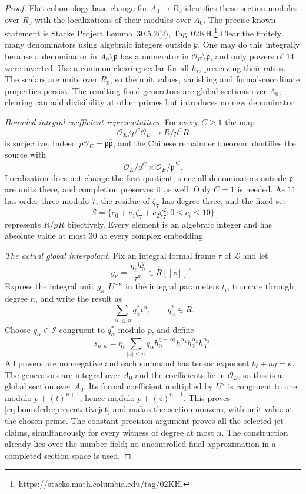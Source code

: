 \documentclass[11pt,a4paper]{article}
\theoremstyle{definition}\newtheorem{remark}[theorem]{Remark}
\begin{document}
\begin{proof}
Flat cohomology base change for $A_0\to R_0$ identifies these section modules over $R_0$ with the localizations of their modules over $A_0$.
The precise known statement is Stacks Project Lemma~30.5.2(2), Tag~02KH.\footnote{\url{https://stacks.math.columbia.edu/tag/02KH}.}
Clear the finitely many denominators using algebraic integers outside $\mathfrak p$.
One may do this integrally because a denominator in $A_0\setminus\mathfrak p$ has a numerator in $\mathcal O_E\setminus\mathfrak p$, and only powers of $14$ were inverted.
Use a common clearing scalar for all $h_i$, preserving their ratios.
The scalars are units over $R_0$, so the unit values, vanishing and formal-coordinate properties persist.
The resulting fixed generators are global sections over $A_0$; clearing can add divisibility at other primes but introduces no new denominator.

\emph{Bounded integral coefficient representatives.}
For every $C\ge1$ the map
\[
 \mathcal O_E/p^C\mathcal O_E\longrightarrow R/p^CR
\]
is surjective.
Indeed $p\mathcal O_E=\mathfrak p\overline{\mathfrak p}$, and the Chinese remainder theorem identifies the source with
\[
 \mathcal O_E/\mathfrak p^C\times
 \mathcal O_E/\overline{\mathfrak p}^{\,C}.
\]
Localization does not change the first quotient, since all denominators outside $\mathfrak p$ are units there, and completion preserves it as well.
Only $C=1$ is needed.
As $11$ has order three modulo $7$, the residue of $\zeta_7$ has degree three, and the fixed set
\[
 \mathcal S=\{c_0+c_1\zeta_7+c_2\zeta_7^2:
                 0\le c_i\le10\}
\]
represents $R/pR$ bijectively.
Every element is an algebraic integer and has absolute value at most $30$ at every complex embedding.

\emph{The actual global interpolant.}
Fix an integral formal frame $\tau$ of $\mathcal L$ and let
\[
 g_\kappa=\frac{\eta_\ell h_0^q}{\tau^\kappa}
 \in R[[z]]^\times.
\]
Express the integral unit $g_\kappa^{-1}U^{-\kappa}$ in the integral parameters $t_i$, truncate through degree $n$, and write the result as
\[
 \sum_{|\alpha|\le n}q^*_\alpha t^\alpha,
 \qquad q^*_\alpha\in R.
\]
Choose $q_\alpha\in\mathcal S$ congruent to $q^*_\alpha$ modulo $p$, and define
\begin{equation}\label{eq:boundedglobalinterpolant}
 s_{n,\kappa}
 =\eta_\ell\sum_{|\alpha|\le n}q_\alpha
      h_0^{q-|\alpha|}h_1^{\alpha_1}
      h_2^{\alpha_2}h_3^{\alpha_3}.
\end{equation}
All powers are nonnegative and each summand has tensor exponent $b_\ell+aq=\kappa$.
The generators are integral over $A_0$ and the coefficients lie in $\mathcal O_E$, so this is a global section over $A_0$.
Its formal coefficient multiplied by $U^\kappa$ is congruent to one modulo $p+(t)^{n+1}$, hence modulo $p+(z)^{n+1}$.
This proves \eqref{eq:boundedrepresentativejet} and makes the section nonzero, with unit value at the chosen prime.
The constant-precision argument proves all the selected jet claims, simultaneously for every witness of degree at most $n$.
The construction already lies over the number field; no uncontrolled final approximation in a completed section space is used.


\end{proof}
\end{document}
